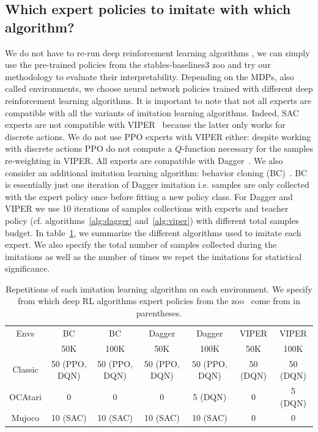 \subsection{Which expert policies to imitate with which algorithm?}
We do not have to re-run deep reinforcement learning algorithms \cite{dqn,ppo,deep-rl-relu1}, we can simply use the pre-trained policies from the stables-baselines3 zoo \cite{zoo} and try our methodology to evaluate their interpretability.
Depending on the MDPs, also called environments, we choose neural network policies trained with different deep reinforcement learning algorithms.
It is important to note that not all experts are compatible with all the variants of imitation learning algorithms.
Indeed, SAC experts \cite{deep-rl-relu1} are not compatible with VIPER~\cite{viper} because the latter only works for discrete actions.
We do not use PPO experts with VIPER either: despite working with discrete actions PPO do not compute a $Q$-function necessary for the samples re-weighting in VIPER.
All experts are compatible with Dagger~\cite{dagger}.
We also consider an additional imitation learning algorithm: behavior cloning (BC)~\cite{behavior-cloning}.
BC is essentially just one iteration of Dagger imitation i.e. samples are only collected with the expert policy once before fitting a new policy class.
For Dagger and VIPER we use 10 iterations of samples collections with experts and teacher policy (cf. algorithms~\ref{alg:dagger} and~\ref{alg:viper}) with different total samples budget.
In table~\ref{tab:repet-distill}, we summarize the different algorithms used to imitate each expert.
We also specify the total number of samples collected during the imitations as well as the number of times we repet the imitations for statistical significance.

\begin{table}
  \centering
  \footnotesize
  \begin{tabular}{c|cccccc}
  \toprule
  Envs & BC & BC & Dagger & Dagger & VIPER & VIPER\\
   & 50K & 100K & 50K & 100K & 50K & 100K\\
  \midrule
  Classic& 50 (PPO, DQN)& 50 (PPO, DQN)& 50 (PPO, DQN)& 50 (PPO, DQN)&  50 (DQN) & 50 (DQN)\\
  OCAtari& 0 & 0 & 0 & 5 (DQN)&  0 & 5 (DQN)\\
  Mujoco& 10 (SAC)& 10 (SAC)& 10 (SAC)& 10 (SAC)&  0 & 0\\
  \bottomrule
  \end{tabular}
  \caption{Repetitions of each imitation learning algorithm on each environment. We specify from which deep RL algorithms expert policies from the zoo~\cite{zoo} come from in parentheses.}
  \label{tab:repet-distill}
\end{table}

